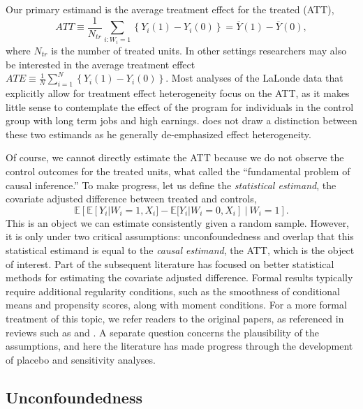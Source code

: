 \documentclass[letterpaper,12pt,leqno]{article}
\begin{document}
Our primary estimand is the average treatment effect for the treated (ATT), 
$$ATT \equiv  \frac{1}{N_{tr}}\sum_{i:W_i=1}\left\{Y_i(1)-Y_i(0)\right\} = \overline{Y}(1) - \overline{Y}(0),$$
where $N_{tr}$ is the number of treated units.
In other settings researchers may also be interested in the average treatment effect $ATE \equiv \frac{1}{N}\sum_{i=1}^N \left\{Y_i(1)-Y_i(0)\right\}.$ Most analyses of the LaLonde data that explicitly allow for treatment effect heterogeneity focus on the ATT, as it makes little sense to contemplate the effect of the program for individuals in the control group with long term jobs and high earnings. \citet{LaLonde} does not draw a distinction between these two estimands as he generally de-emphasized effect heterogeneity.

Of course, we cannot directly estimate the ATT because we do not observe the control outcomes for the treated units, what \citep{holland1986statistics} called the ``fundamental problem of causal inference.'' To make progress,  let us define the \emph{statistical estimand}, the covariate adjusted difference between treated and controls,
\[ 
\mathbb{E}\left[\mathbb{E}[Y_i|W_i=1,X_i]
-\mathbb{E}[Y_i|W_i=0,X_i]\ |\ W_i=1
\right].
\]
This is an object we can estimate consistently given a random sample. However, it is only under two critical assumptions: unconfoundedness and overlap that this statistical estimand is equal to the \emph{causal estimand}, the ATT, which is the object of interest. Part of the subsequent literature has focused on better statistical methods for estimating the covariate adjusted difference. Formal results typically require additional regularity conditions, such as the smoothness of conditional means and propensity scores, along with moment conditions. For a more formal treatment of this topic, we refer readers to the original papers, as referenced in reviews such as \citet{imbens2009recent} and \citet{abadie2018econometric}. A separate question concerns the plausibility of the assumptions, and here the literature has made progress through the development of placebo and sensitivity analyses.



\subsection{Unconfoundedness}
\end{document}
